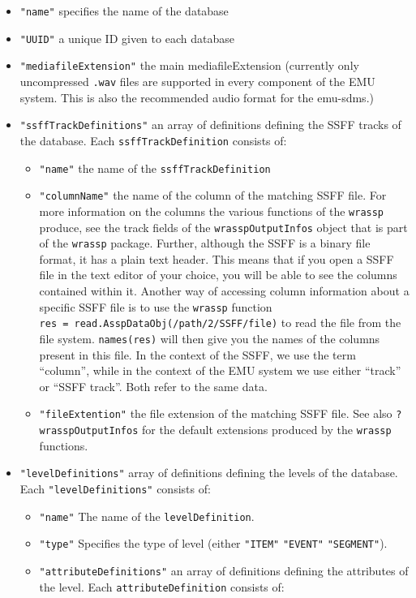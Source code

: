 \documentclass[]{book}
\theoremstyle{definition}
\theoremstyle{definition}
\theoremstyle{definition}
\theoremstyle{remark}
\begin{document}
\begin{itemize}
\item
  \texttt{"name"} specifies the name of the database
\item
  \texttt{"UUID"} a unique ID given to each database
\item
  \texttt{"mediafileExtension"} the main mediafileExtension (currently
  only uncompressed \texttt{.wav} files are supported in every component
  of the EMU system. This is also the recommended audio format for the
  {emu-sdms}.)
\item
  \texttt{"ssffTrackDefinitions"} an array of definitions defining the
  SSFF tracks of the database. Each \texttt{ssffTrackDefinition}
  consists of:

  \begin{itemize}
  \item
    \texttt{"name"} the name of the \texttt{ssffTrackDefinition}
  \item
    \texttt{"columnName"} the name of the column of the matching SSFF
    file. For more information on the columns the various functions of
    the \texttt{wrassp} produce, see the track fields of the
    \texttt{wrasspOutputInfos} object that is part of the
    \texttt{wrassp} package. Further, although the SSFF is a binary file
    format, it has a plain text header. This means that if you open a
    SSFF file in the text editor of your choice, you will be able to see
    the columns contained within it. Another way of accessing column
    information about a specific SSFF file is to use the \texttt{wrassp}
    function \texttt{res~=~read.AsspDataObj(/path/2/SSFF/file)} to read
    the file from the file system. \texttt{names(res)} will then give
    you the names of the columns present in this file. In the context of
    the SSFF, we use the term ``column'', while in the context of the
    EMU system we use either ``track'' or ``SSFF track''. Both refer to
    the same data.
  \item
    \texttt{"fileExtention"} the file extension of the matching SSFF
    file. See also \texttt{?wrasspOutputInfos} for the default
    extensions produced by the \texttt{wrassp} functions.
  \end{itemize}
\item
  \texttt{"levelDefinitions"} array of definitions defining the levels
  of the database. Each \texttt{"levelDefinitions"} consists of:

  \begin{itemize}
  \item
    \texttt{"name"} The name of the \texttt{levelDefinition}.
  \item
    \texttt{"type"} Specifies the type of level (either \texttt{"ITEM"}
    \textbar{} \texttt{"EVENT"} \textbar{} \texttt{"SEGMENT"}).
  \item
    \texttt{"attributeDefinitions"} an array of definitions defining the
    attributes of the level. Each \texttt{attributeDefinition} consists
    of:


\end{itemize}
\end{itemize}
\end{document}
